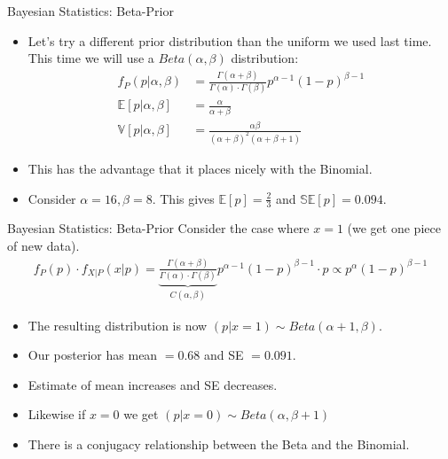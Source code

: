 \documentclass[aspectratio=169]{beamer}
\begin{document}
\begin{frame}{Bayesian Statistics: Beta-Prior}
\begin{itemize}
\item Let's try a different \alert{prior distribution} than the uniform we used last time. This time we will use a $Beta(\alpha,\beta)$ distribution:
\begin{align*}
f _ { P } ( p | \alpha,\beta) &= \frac { \Gamma ( \alpha + \beta ) } { \Gamma ( \alpha ) \cdot \Gamma ( \beta ) } p ^ { \alpha - 1 } ( 1 - p ) ^ { \beta - 1 }\\
\mathbb{E}[p | \alpha,\beta] &=\frac{\alpha}{\alpha + \beta}\\
\mathbb{V}[p | \alpha,\beta] &=\frac{\alpha \beta}{(\alpha + \beta)^2(\alpha+\beta+1)}
\end{align*}
\item This has the advantage that it places nicely with the Binomial.
\item Consider $\alpha=16, \beta=8$. This gives $\mathbb{E}[p ] = \frac{2}{3}$ and $\mathbb{SE}[p] = 0.094$. 
\end{itemize}
\end{frame}


\begin{frame}{Bayesian Statistics: Beta-Prior}
Consider the case where $x=1$ (we get one piece of new data).
\begin{align*}
f _ { P } ( p ) \cdot f _ { X | P } ( x | p ) =\underbrace{ \frac { \Gamma ( \alpha + \beta ) } { \Gamma ( \alpha ) \cdot \Gamma ( \beta ) }}_{C(\alpha,\beta)} p ^ { \alpha - 1 } ( 1 - p ) ^ { \beta - 1 } \cdot p \propto  p ^ { \alpha  } ( 1 - p ) ^ { \beta - 1 } 
\end{align*}
\begin{itemize}
\item The resulting distribution is now $(p|x=1)\sim Beta(\alpha+1,\beta)$.
\item Our posterior has mean $=0.68$ and SE $=0.091$.
\item Estimate of mean increases and SE decreases.
\item Likewise if $x=0$ we get $(p|x=0)\sim Beta(\alpha,\beta+1)$
\item There is a \alert{conjugacy} relationship between the Beta and the Binomial.
\end{itemize}
\end{frame}
\end{document}
